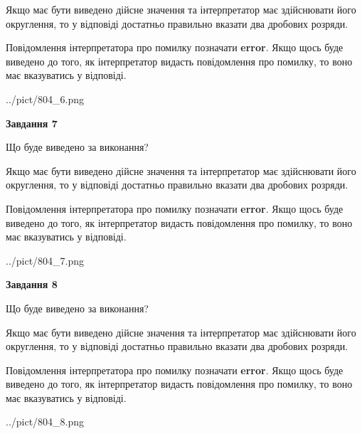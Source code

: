 \documentclass[12pt, ukrainian]{article}
\begin{document}
{\begin {Large}
Якщо має бути виведено дійсне значення та інтерпретатор має здійснювати його округлення, 
то у відповіді достатньо правильно вказати два дробових розряди.

Повідомлення інтерпретатора про помилку позначати \textbf{error}.
Якщо щось буде виведено до того, як інтерпретатор видасть повідомлення про помилку, 
то воно має вказуватись у відповіді. \par

\begin{center}
	{../pict/804_6.png}
\end{center}
\newpage

{\begin {center}\textbf{Завдання 7}\end {center}}\par
Що буде виведено за виконання? \par

Якщо має бути виведено дійсне значення та інтерпретатор має здійснювати його округлення, 
то у відповіді достатньо правильно вказати два дробових розряди.

Повідомлення інтерпретатора про помилку позначати \textbf{error}.
Якщо щось буде виведено до того, як інтерпретатор видасть повідомлення про помилку, 
то воно має вказуватись у відповіді. \par

\begin{center}
	{../pict/804_7.png}
\end{center}
\newpage

{\begin {center}\textbf{Завдання 8}\end {center}}\par
Що буде виведено за виконання? \par

Якщо має бути виведено дійсне значення та інтерпретатор має здійснювати його округлення, 
то у відповіді достатньо правильно вказати два дробових розряди.

Повідомлення інтерпретатора про помилку позначати \textbf{error}.
Якщо щось буде виведено до того, як інтерпретатор видасть повідомлення про помилку, 
то воно має вказуватись у відповіді. \par

\begin{center}
	{../pict/804_8.png}
\end{center}
\newpage


\end{Large}}
\end{document}
